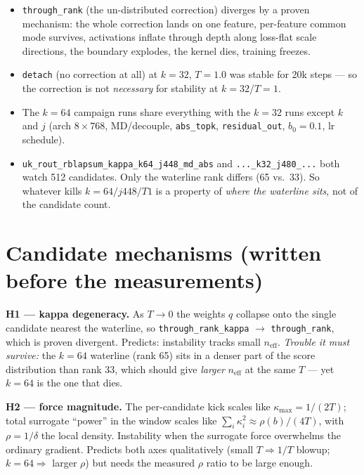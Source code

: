 \documentclass[11pt,a4paper]{article}
\newcommand{\code}[1]{\texttt{#1}}
\newcommand{\neff}{n_{\mathrm{eff}}}
\begin{document}
\begin{itemize}[leftmargin=1.4em]
\item \code{through\_rank} (the un-distributed correction) diverges by a
  proven mechanism: the whole correction lands on one feature, per-feature
  common mode survives, activations inflate through depth along loss-flat
  scale directions, the boundary explodes, the kernel dies, training freezes.
\item \code{detach} (no correction at all) at $k{=}32$, $T{=}1.0$ was stable
  for 20k steps --- so the correction is not \emph{necessary} for stability at
  $k{=}32$/$T{=}1$.
\item The $k{=}64$ campaign runs share everything with the $k{=}32$ runs
  except $k$ and $j$ (arch $8\times768$, MD/decouple, \code{abs\_topk},
  \code{residual\_out}, $b_0=0.1$, lr schedule).
\item \code{uk\_rout\_rblapsum\_kappa\_k64\_j448\_md\_abs} and
  \code{...\_k32\_j480\_...} both watch 512 candidates. Only the waterline
  rank differs (65 vs.\ 33). So whatever kills $k{=}64/j448/T1$ is a property
  of \emph{where the waterline sits}, not of the candidate count.
\end{itemize}

\section{Candidate mechanisms (written before the measurements)}

\textbf{H1 --- kappa degeneracy.} As $T\to0$ the weights $q$ collapse onto the
single candidate nearest the waterline, so \code{through\_rank\_kappa}
$\to$ \code{through\_rank}, which is proven divergent. Predicts: instability
tracks small $\neff$. \emph{Trouble it must survive:} the $k{=}64$ waterline
(rank 65) sits in a denser part of the score distribution than rank 33, which
should give \emph{larger} $\neff$ at the same $T$ --- yet $k{=}64$ is the one
that dies.

\textbf{H2 --- force magnitude.} The per-candidate kick scales like
$\kappa_{\max} = 1/(2T)$; total surrogate ``power'' in the window scales like
$\sum_i \kappa_i^2 \approx \rho(b)/(4T)$, with $\rho = 1/\delta$ the local
density. Instability when the surrogate force overwhelms the ordinary
gradient. Predicts both axes qualitatively (small $T \Rightarrow 1/T$ blowup;
$k{=}64 \Rightarrow$ larger $\rho$) but needs the measured $\rho$ ratio to be
large enough.
\end{document}
